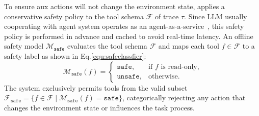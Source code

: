  To ensure aux actions will not change the environment state, \name{} applies a conservative safety policy to the tool schema $\mathcal{F}$ of trace $\tau$. Since LLM usually cooperating with agent system operates as an agent-as-a-service~\cite{li2026aidev}, this safety policy is performed in advance and cached to avoid real-time latency. An offline safety model $\mathcal{M}_{\mathtt{safe}}$ evaluates the tool schema $\mathcal{F}$ and maps each tool $f \in \mathcal{F}$ to a safety label as shown in Eq.\ref{equ:safeclassfier}:
\begin{equation}
\mathcal{M}_{\mathtt{safe}}(f)=\begin{cases}\mathtt{safe},&\text{if }f\text{ is read-only,}\\\mathtt{unsafe},&\text{otherwise.}\end{cases}
\label{equ:safeclassfier}
\end{equation}
The system exclusively permits tools from the valid subset $\mathcal{F}_{\mathtt{safe}}=\{f \in \mathcal{F} \mid \mathcal{M}_{\mathtt{safe}}(f)=\mathtt{safe}\}$, categorically rejecting any action that changes the environment state or influences the task process.

